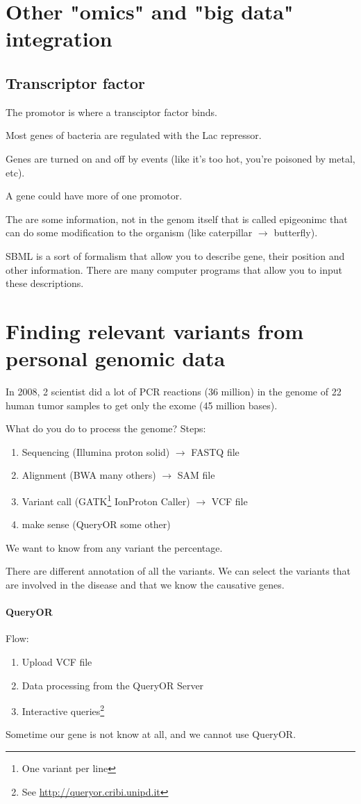 \section{Other "omics" and "big data" integration}

\subsection{Transcriptor factor}
The promotor is where a transciptor factor binds.

Most genes of bacteria are regulated with the Lac repressor.

Genes are turned on and off by events (like it's too hot, you're poisoned by 
metal, etc).

A gene could have more of one promotor.

The are some information, not in the genom itself that is called epigeonimc 
that can do some modification to the organism (like caterpillar $\to$ 
butterfly).

SBML is a sort of formalism that allow you to describe gene, their position and 
other information. There are many computer programs that allow you to input 
these descriptions.

\section{Finding relevant variants from personal genomic data}

In 2008, 2 scientist did a lot of PCR reactions (36 million) in the genome of 
22 human tumor samples to get only the exome (45 million bases).

What do you do to process the genome?
Steps:
\begin{enumerate}
	\item Sequencing (Illumina proton solid) $\to$ FASTQ file
	\item Alignment (BWA many others) $\to$ SAM file
	\item Variant call (GATK\footnote{One variant per line} IonProton Caller) 
	$\to$ VCF file
	\item make sense (QueryOR some other)
\end{enumerate}

We want to know from any variant the percentage.

There are different annotation of all the variants. We can select the variants 
that are involved in the disease and that we know the causative genes.

\paragraph{QueryOR}
Flow:
\begin{enumerate}
	\item Upload VCF file
	\item Data processing from the QueryOR Server
	\item Interactive queries\footnote{See \url{http://queryor.cribi.unipd.it}}
\end{enumerate}

Sometime our gene is not know at all, and we cannot use QueryOR.